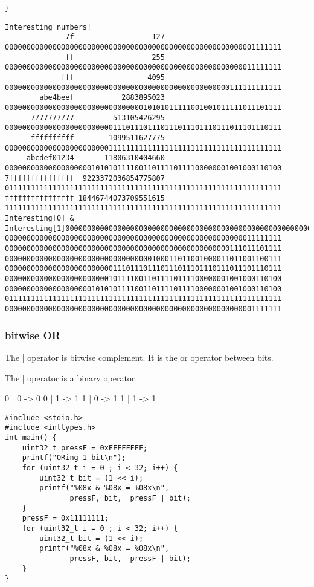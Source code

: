 \documentclass[11pt]{article}
\begin{document}
\begin{enumerate}
\begin{enumerate}
\begin{verbatim}
}

\end{verbatim}

\begin{verbatim}
Interesting numbers!
              7f                  127 0000000000000000000000000000000000000000000000000000000001111111
              ff                  255 0000000000000000000000000000000000000000000000000000000011111111
             fff                 4095 0000000000000000000000000000000000000000000000000000111111111111
        abe4beef           2883895023 0000000000000000000000000000000010101011111001001011111011101111
      7777777777         513105426295 0000000000000000000000000111011101110111011101110111011101110111
      ffffffffff        1099511627775 0000000000000000000000001111111111111111111111111111111111111111
     abcdef01234       11806310404660 0000000000000000000010101011110011011110111100000001001000110100
7fffffffffffffff  9223372036854775807 0111111111111111111111111111111111111111111111111111111111111111
ffffffffffffffff 18446744073709551615 1111111111111111111111111111111111111111111111111111111111111111
Interesting[0] & Interesting[1]0000000000000000000000000000000000000000000000000000000001111111
0000000000000000000000000000000000000000000000000000000011111111
0000000000000000000000000000000000000000000000000000111011101111
0000000000000000000000000000000000100011011001000011011001100111
0000000000000000000000000111011101110111011101110111011101110111
0000000000000000000000001011110011011110111100000001001000110100
0000000000000000000010101011110011011110111100000001001000110100
0111111111111111111111111111111111111111111111111111111111111111
0000000000000000000000000000000000000000000000000000000001111111
\end{verbatim}
\end{enumerate}
\end{enumerate}



\subsubsection{bitwise OR}
\label{sec:orgd3f22ed}

The | operator is bitwise complement. It is the or operator between
bits. 

The | operator is a binary operator.

0 | 0 -> 0
0 | 1 -> 1
1 | 0 -> 1
1 | 1 -> 1

\begin{verbatim}
#include <stdio.h>
#include <inttypes.h>
int main() {  
    uint32_t pressF = 0xFFFFFFFF;
    printf("ORing 1 bit\n");
    for (uint32_t i = 0 ; i < 32; i++) {
        uint32_t bit = (1 << i);
        printf("%08x & %08x = %08x\n",
               pressF, bit,  pressF | bit);
    }
    pressF = 0x11111111;
    for (uint32_t i = 0 ; i < 32; i++) {
        uint32_t bit = (1 << i);
        printf("%08x & %08x = %08x\n",
               pressF, bit,  pressF | bit);
    }
}
\end{verbatim}
\end{document}
